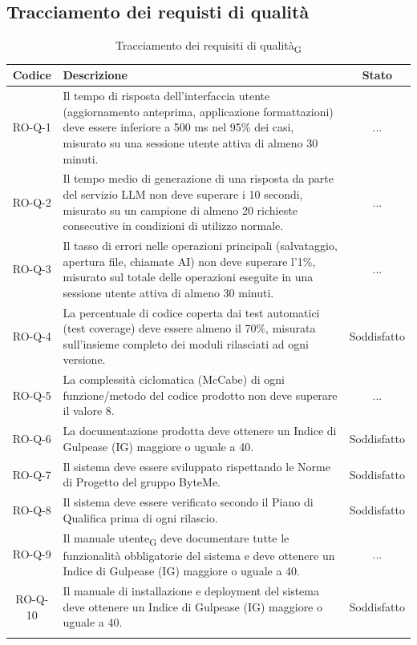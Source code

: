 \documentclass[11pt,a4paper]{article}
\newcommand{\gls}[1]{#1\textsubscript{G}}
\begin{document}
\subsection{Tracciamento dei requisti di qualità}
\begin{longtable}{|c|p{11cm}|c|}
\hline
\textbf{Codice} & \textbf{Descrizione} & \textbf{Stato}\\
\hline
\endhead
RO-Q-1 & Il tempo di risposta dell'interfaccia utente (aggiornamento anteprima, applicazione formattazioni) deve essere inferiore a 500 ms nel 95\% dei casi, misurato su una sessione utente attiva di almeno 30 minuti. & ... \\
\hline
RO-Q-2 & Il tempo medio di generazione di una risposta da parte del servizio LLM non deve superare i 10 secondi, misurato su un campione di almeno 20 richieste consecutive in condizioni di utilizzo normale.  & ... \\
\hline
RO-Q-3 & Il tasso di errori nelle operazioni principali (salvataggio, apertura file, chiamate AI) non deve superare l'1\%, misurato sul totale delle operazioni eseguite in una sessione utente attiva di almeno 30 minuti. & ... \\
\hline
RO-Q-4 & La percentuale di codice coperta dai test automatici (test coverage) deve essere almeno il 70\%, misurata sull'insieme completo dei moduli rilasciati ad ogni versione. & Soddisfatto \\
\hline
RO-Q-5 & La complessità ciclomatica (McCabe) di ogni funzione/metodo del codice prodotto non deve superare il valore 8. & ... \\
\hline
RO-Q-6 & La documentazione prodotta deve ottenere un Indice di Gulpease (IG) maggiore o uguale a 40. & Soddisfatto \\
\hline
RO-Q-7 & Il sistema deve essere sviluppato rispettando le Norme 
di Progetto del gruppo ByteMe. & Soddisfatto \\
\hline
RO-Q-8 & Il sistema deve essere verificato secondo il Piano di Qualifica prima di ogni rilascio. & Soddisfatto\\
\hline
RO-Q-9 & Il \gls{manuale utente} deve documentare tutte le funzionalità obbligatorie del sistema e deve ottenere un Indice di Gulpease (IG) maggiore o uguale a 40. & ... \\
\hline
RO-Q-10 & Il manuale di installazione e deployment del sistema deve ottenere un Indice di Gulpease (IG) maggiore o uguale a 40. & Soddisfatto \\
\hline
\addlinespace[1em]
\caption{Tracciamento dei \gls{requisiti di qualità}}
\label{tab:tracciamento_requisiti_qualità}
\end{longtable}
\end{document}
